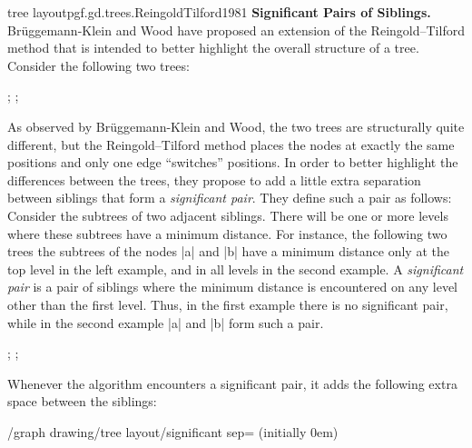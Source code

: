 \begin{gdalgorithm}{tree layout}{pgf.gd.trees.ReingoldTilford1981}
  \noindent\textbf{Significant Pairs of Siblings.}
  Br\"uggemann-Klein and Wood have proposed an extension of the
  Reingold--Tilford method that is intended to better highlight the
  overall structure of a tree. Consider the following two trees:

\begin{codeexample}[]
\tikz [baseline=(a.base), tree layout, minimum number of children=2,
       sibling distance=5mm, level distance=5mm]
;\quad
\tikz [baseline=(a.base), tree layout, minimum number of children=2,
       sibling distance=5mm, level distance=5mm]
;
\end{codeexample}  
  As observed by Br\"uggemann-Klein and Wood, the two trees are
  structurally quite different, but the Reingold--Tilford method
  places the nodes at exactly the same positions and only one edge
  ``switches'' positions. In order to better highlight the differences
  between the trees, they propose to add a little extra separation
  between siblings that form a \emph{significant pair}. They define
  such a pair as follows: Consider the subtrees of two adjacent
  siblings. There will be one or more levels where these subtrees have
  a minimum distance. For instance, the following two trees the
  subtrees of the nodes |a| and |b| have a minimum distance only at
  the top level in the left example, and in all levels in the second
  example. A \emph{significant pair} is a pair of siblings where the
  minimum distance is encountered on any level other than the first
  level. Thus, in the first example there is no significant pair,
  while in the second example |a| and |b| form such a pair.
\begin{codeexample}[]
\tikz {};
\quad
\tikz {};
\end{codeexample}
  Whenever the algorithm encounters a significant pair, it adds the
  following extra space between the siblings:
  \begin{key}{/graph drawing/tree layout/significant
      sep= (initially 0em)}

\end{key}
\end{gdalgorithm}
